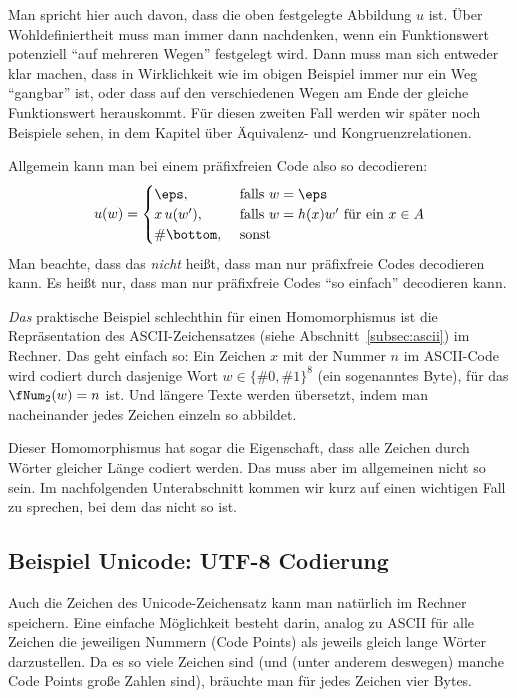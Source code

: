 Man spricht hier auch davon, dass die oben festgelegte Abbildung $u$
 ist.
%
Über Wohldefiniertheit muss man immer dann nachdenken, wenn ein
Funktionswert potenziell "`auf mehreren Wegen"' festgelegt wird.
%
Dann muss man sich entweder klar machen, dass in Wirklichkeit wie im
obigen Beispiel immer nur ein Weg "`gangbar"' ist, oder dass auf den
verschiedenen Wegen am Ende der gleiche Funktionswert herauskommt.
%
Für diesen zweiten Fall werden wir später noch Beispiele sehen, \zB in
dem Kapitel über Äquivalenz- und Kongruenzrelationen.

Allgemein kann man bei einem präfixfreien Code also so decodieren:
\[
u(w) = 
\begin{cases}
  \eps, & \text{ falls } w=\eps\\
  x\,u(w'), & \text{ falls } w=h(x)w' \text{ für ein } x\in A \\
  \#{\bottom},  & \text{ sonst }\\
\end{cases}
\]
%
Man beachte, dass das \emph{nicht} heißt, dass man nur präfixfreie
Codes decodieren kann.
%
Es heißt nur, dass man nur präfixfreie Codes "`so einfach"' decodieren
kann.

\emph{Das} praktische Beispiel schlechthin für einen Homomorphismus
ist die Repräsentation des ASCII-Zeichensatzes (siehe
Abschnitt~\ref{subsec:ascii}) im Rechner.
%
Das geht einfach so:
%
Ein Zeichen $x$ mit der Nummer $n$ im ASCII-Code wird codiert durch
dasjenige Wort $w\in \{\#0,\#1\}^8$ (ein sogenanntes Byte), für das
$\fNum_2(w)=n$ ist.
%
Und längere Texte werden übersetzt, indem man nacheinander jedes
Zeichen einzeln so abbildet.

Dieser Homomorphismus hat sogar die Eigenschaft, dass alle Zeichen
durch Wörter gleicher Länge codiert werden.
%
Das muss aber im allgemeinen nicht so sein.
%
Im nachfolgenden Unterabschnitt kommen wir kurz auf einen wichtigen
Fall zu sprechen, bei dem das nicht so ist.

\Tut\subsection{Beispiel Unicode: UTF-8 Codierung}
\label{subsec:utf-8}

Auch die Zeichen des Unicode-Zeichensatz kann man natürlich im Rechner
speichern.
%
Eine einfache Möglichkeit besteht darin, analog zu ASCII für alle
Zeichen die jeweiligen Nummern (Code Points) als jeweils gleich lange
Wörter darzustellen.
%
Da es so viele Zeichen sind (und (unter anderem deswegen) manche Code
Points große Zahlen sind), bräuchte man für jedes Zeichen vier Bytes.


